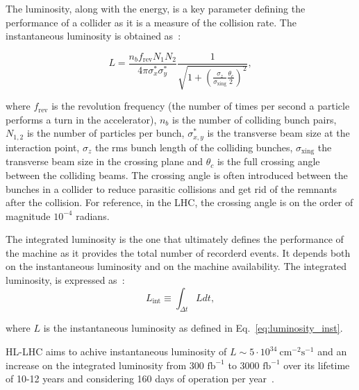 The luminosity, along with the energy, is a key parameter defining the performance of a collider as it is a measure of the collision rate. The instantaneous luminosity is obtained as~\cite{luminosity}:

\begin{equation}\label{eq:luminosity_inst}
    L = \frac{n_b f_\mathrm{rev}N_1 N_2}{4 \pi \sigma^\ast_x \sigma^\ast_y} \frac{1}{\sqrt{1+\left ( \frac{\sigma_z}{\sigma_\mathrm{xing}} \frac{\theta_c}{2} \right )^2}},
\end{equation}

where $f_{\mathrm{rev}}$ is the revolution frequency (the number of times per second a particle performs a turn in the accelerator), $n_b$ is the number of colliding bunch pairs, $N_{1,2}$ is the number of particles per bunch, $\sigma^\ast_{x,y}$ is the transverse beam size at the interaction point, $\sigma_z$ the rms bunch length of the colliding bunches, $\sigma_{\mathrm{xing}}$ the transverse beam size in the crossing plane and $\theta_c$ is the full crossing angle between the colliding beams. %
 The crossing angle is often introduced between the bunches in a collider to reduce parasitic collisions and get rid of the remnants after the collision. For reference, in the LHC, the crossing angle is on the order of magnitude $10^{-4}$ radians. %

The integrated luminosity is the one that ultimately defines the performance of the machine as it provides the total number of recorderd events. It depends both on the instantaneous luminosity and on the machine availability. The integrated luminosity, is expressed as~\cite{HL_LHC_yellow_report}:
\begin{equation}\label{eq:integrated_luminosity}
    L_\mathrm{int} \equiv \int_{\Delta t} L dt,
\end{equation}

where $L$ is the instantaneous luminosity as defined in Eq.~\eqref{eq:luminosity_inst}.

HL-LHC aims to achive instantaneous luminosity of $L \sim 5 \cdot 10^{34} \ \mathrm{cm^{-2} s^{-1}}$ and an increase on the integrated luminosity from 300 $\mathrm{fb^{-1}}$ to 3000 $\mathrm{fb^{-1}}$ over its lifetime of 10-12 years and considering 160 days of operation per year~\cite{Brunning_Rossi}. %

